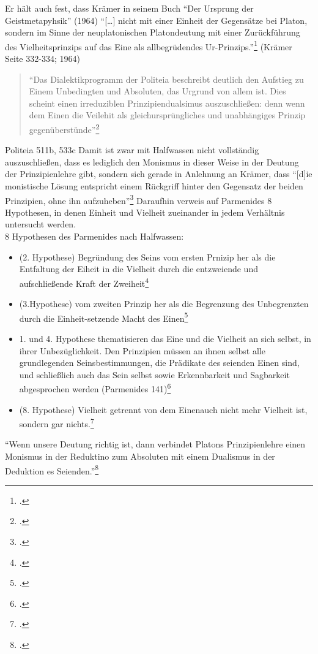 \documentclass[12pt]{article}
\newcommand*{\zitatblock}[1]{%
    \begin{quote}
    \fontsize{10}{12}\selectfont
    \setlength{\parskip}{1.0em}
    #1
    \end{quote}
}
\begin{document}
Er hält auch fest, dass Krämer in seinem Buch \enquote{Der Ursprung der Geistmetapyhsik} (1964) \enquote{[\dots] nicht mit einer Einheit der Gegensätze bei Platon, sondern im Sinne der neuplatonischen Platondeutung mit einer Zurückführung des Vielheitsprinzips auf das Eine als allbegrüdendes Ur-Prinzips.}\footcite[][S. 68]{HalfwassenMonismusDualismus} (Krämer Seite 332-334; 1964) 
\zitatblock{\enquote{Das Dialektikprogramm der Politeia beschreibt deutlich den Aufstieg zu Einem Unbedingten und Absoluten, das Urgrund von allem ist. Dies scheint einen irreduziblen Prinzipiendualsimus auszuschließen: denn wenn dem Einen die Veilehit als gleichursprüngliches und unabhängiges Prinzip gegenüberstünde}\footcite[][S. 70f.]{HalfwassenMonismusDualismus}} Politeia 511b, 533c
Damit ist zwar mit Halfwassen nicht vollständig auszuschließen, dass es lediglich den Monismus in dieser Weise in der Deutung der Prinzipienlehre gibt, sondern sich gerade in Anlehnung an Krämer, dass \enquote{[d]ie monistische Lösung entspricht einem Rückgriff hinter den Gegensatz der beiden Prinzipien, ohne ihn aufzuheben}\footcite[vgl.][S. 333]{Krämer1964Geistmetaphysik}
Daraufhin verweis auf Parmenides 8 Hypothesen, in denen Einheit und Vielheit zueinander in jedem Verhältnis untersucht werden.\\
8 Hypothesen des Parmenides nach Halfwassen:
\begin{itemize}
    \item {(2. Hypothese) Begründung des Seins vom ersten Prnizip her als die Entfaltung der Eiheit in die Vielheit durch die entzweiende und aufschließende Kraft der Zweiheit}\footcite[vgl.][S. 72]{HalfwassenMonismusDualismus}
    \item {(3.Hypothese) vom zweiten Prinzip her als die Begrenzung des Unbegrenzten durch die Einheit-setzende Macht des Einen}\footcite[vgl.][S. 72]{HalfwassenMonismusDualismus}
    \item {1. und 4. Hypothese thematisieren das Eine und die Vielheit an sich selbst, in ihrer Unbezüglichkeit. Den Prinzipien müssen an ihnen selbst alle grundlegenden Seinsbestimmungen, die Prädikate des seienden Einen sind, und schließlich auch das Sein selbst sowie Erkennbarkeit und Sagbarkeit abgesprochen werden (Parmenides 141)}\footcite[vgl.][S. 72]{HalfwassenMonismusDualismus}
    \item {(8. Hypothese) Vielheit getrennt von dem Einenauch nicht mehr Vielheit ist, sondern gar nichts.\footcite[vgl.][S. 73]{HalfwassenMonismusDualismus}}
\end{itemize}
\enquote{Wenn unsere Deutung richtig ist, dann verbindet Platons Prinzipienlehre einen Monismus in der Reduktino zum Absoluten mit einem Dualismus in der Deduktion es Seienden.}\footcite[][S. 79]{HalfwassenMonismusDualismus}
\end{document}
